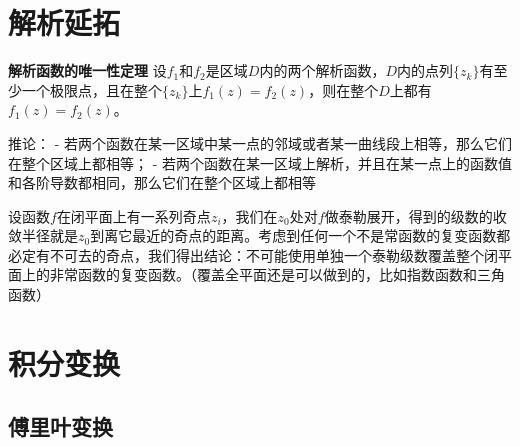 \hypertarget{ux89e3ux6790ux5ef6ux62d3}{%
\section{解析延拓}\label{ux89e3ux6790ux5ef6ux62d3}}

\textbf{解析函数的唯一性定理}
设\(f_1\)和\(f_2\)是区域\(D\)内的两个解析函数，\(D\)内的点列\(\{z_k\}\)有至少一个极限点，且在整个\(\{z_k\}\)上\(f_1(z)=f_2(z)\)，则在整个\(D\)上都有\(f_1(z)=f_2(z)\)。

推论： -
若两个函数在某一区域中某一点的邻域或者某一曲线段上相等，那么它们在整个区域上都相等；
-
若两个函数在某一区域上解析，并且在某一点上的函数值和各阶导数都相同，那么它们在整个区域上都相等

设函数\(f\)在闭平面上有一系列奇点\(z_i\)，我们在\(z_0\)处对\(f\)做泰勒展开，得到的级数的收敛半径就是\(z_0\)到离它最近的奇点的距离。考虑到任何一个不是常函数的复变函数都必定有不可去的奇点，我们得出结论：不可能使用单独一个泰勒级数覆盖整个闭平面上的非常函数的复变函数。（覆盖全平面还是可以做到的，比如指数函数和三角函数）

\hypertarget{ux79efux5206ux53d8ux6362}{%
\section{积分变换}\label{ux79efux5206ux53d8ux6362}}

\hypertarget{ux5085ux91ccux53f6ux53d8ux6362}{%
\subsection{傅里叶变换}\label{ux5085ux91ccux53f6ux53d8ux6362}}
